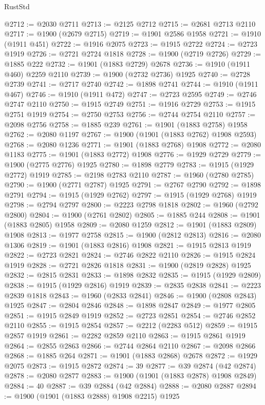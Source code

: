 \begin{lexlean}{RustStd}
\begin{coremodule}
{\begin{coremodule}
{{{{{{{{{{{{{{{{{{{{{{{{{{{{{{{{{{{{{{{{{{{@2712 := @2030 @2711
@2713 := @2125 @2712
@2715 := @2681 @2713 @2110
@2717 := @1900 (@2679 @2715)
@2719 := @1901 @2586 @1958
@2721 := @1910 (@1911 @451)
@2722 := @1916 @2075
@2723 := @1915 @2722
@2724 := @2723 @1919
@2726 := @2721 @2724 @1818
@2728 := @1900 (@2719 @2726)
@2729 := @1885 @222
@2732 := @1901 (@1883 @2729) @2678
@2736 := @1910 (@1911 @460) @2259 @2110
@2739 := @1900 (@2732 @2736) @1925
@2740 := @2728 @2739
@2741 := @2717 @2740
@2742 := @1898 @2741
@2744 := @1910 (@1911 @467)
@2746 := @1910 (@1911 @472)
@2747 := @2723 @2595
@2749 := @2746 @2747 @2110
@2750 := @1915 @2749
@2751 := @1916 @2729
@2753 := @1915 @2751 @1919
@2754 := @2750 @2753
@2756 := @2744 @2754 @2110
@2757 := @2098 @2756
@2758 := @1885 @239
@2761 := @1901 (@1883 @2758) @1958
@2762 := @2080 @1197
@2767 := @1900 (@1901 (@1883 @2762) @1908 @2593)
@2768 := @2080 @1236
@2771 := @1901 (@1883 @2768) @1908
@2772 := @2080 @1183
@2775 := @1901 (@1883 @2772) @1908
@2776 := @1929 @2729
@2779 := @1900 (@2775 @2776) @1925
@2780 := @1898 @2779
@2783 := @1915 (@1929 @2772) @1919
@2785 := @2198 @2783 @2110
@2787 := @1960 (@2780 @2785)
@2790 := @1900 (@2771 @2787) @1925
@2791 := @2767 @2790
@2792 := @1898 @2791
@2794 := @1915 (@1929 @2762)
@2797 := @1915 (@1929 @2768) @1919
@2798 := @2794 @2797
@2800 := @2223 @2798 @1818
@2802 := @1960 (@2792 @2800)
@2804 := @1900 (@2761 @2802)
@2805 := @1885 @244
@2808 := @1901 (@1883 @2805) @1958
@2809 := @2080 @1259
@2812 := @1901 (@1883 @2809) @1908
@2813 := @1977 @2758
@2815 := @1900 (@2812 @2813)
@2816 := @2080 @1306
@2819 := @1901 (@1883 @2816) @1908
@2821 := @1915 @2813 @1919
@2822 := @2723 @2821
@2824 := @2746 @2822 @2110
@2826 := @1915 @2824 @1919
@2828 := @2721 @2826 @1818
@2831 := @1900 (@2819 @2828) @1925
@2832 := @2815 @2831
@2833 := @1898 @2832
@2835 := @1915 (@1929 @2809)
@2838 := @1915 (@1929 @2816) @1919
@2839 := @2835 @2838
@2841 := @2223 @2839 @1818
@2843 := @1960 (@2833 @2841)
@2846 := @1900 (@2808 @2843) @1925
@2847 := @2804 @2846
@2848 := @1898 @2847
@2849 := @1977 @2805
@2851 := @1915 @2849 @1919
@2852 := @2723 @2851
@2854 := @2746 @2852 @2110
@2855 := @1915 @2854
@2857 := @2212 (@2283 @512)
@2859 := @1915 @2857 @1919
@2861 := @2282 @2859 @2110
@2863 := @1915 @2861 @1919
@2864 := @2855 @2863
@2866 := @2744 @2864 @2110
@2867 := @2098 @2866
@2868 := @1885 @264
@2871 := @1901 (@1883 @2868) @2678
@2872 := @1929 @2075
@2873 := @1915 @2872
@2874 := 39
@2877 := @39 @2874 (@42 @2874)
@2878 := @2080 @2877
@2883 := @1900 (@1901 (@1883 @2878) @1908 @2849)
@2884 := 40
@2887 := @39 @2884 (@42 @2884)
@2888 := @2080 @2887
@2894 := @1900 (@1901 (@1883 @2888) @1908 @2215) @1925
}}}}}}}}}}}}}}}}}}}}}}}}}}}}}}}}}}}}}}}}}}}
\end{coremodule}}
\end{coremodule}
\end{lexlean}
